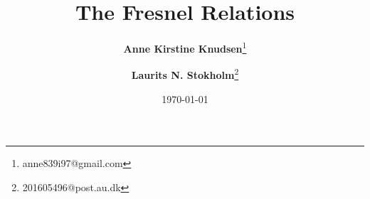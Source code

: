 \documentclass[danish, a4paper, 11pt, onecolumn, oneside]{memoir}
\title{The Fresnel Relations}
\author{%
    \textbf{Anne Kirstine Knudsen}\thanks{anne839i97@gmail.com}
    \and \textbf{Laurits N. Stokholm}\thanks{201605496@post.au.dk}
}
\date{\today}
\begin{document}
\begin{titlingpage}
\maketitle
\end{titlingpage}

%
%
%
%
%
%
\end{document}
